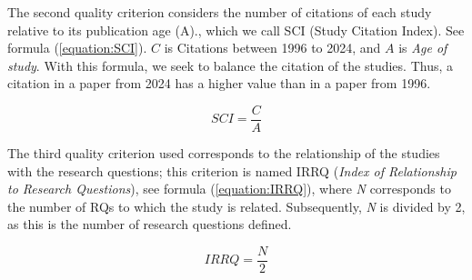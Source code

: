 The second quality criterion considers the number of citations of each study relative to its publication age (A)., which we call SCI (Study Citation Index). See  formula (\ref{equation:SCI}). $C$ is Citations between 1996 to 2024, and $A$ is \textit{Age of study}. With this formula, we seek to balance the citation of the studies. Thus, a citation in a  paper from 2024 has a higher value than in a paper from 1996.


\begin{equation}
	\label{equation:SCI}
	SCI = \frac{C}{A}
\end{equation}


\hbox{}
The third quality criterion used corresponds to the relationship of the studies with the research questions; this criterion is named IRRQ (\textit{Index of Relationship to Research Questions}), see formula (\ref{equation:IRRQ}), where \textit{N} corresponds to the number of RQs to which the study is related. Subsequently, \textit{N} is divided by 2, as this is the number of research questions defined.

\begin{equation}
	\label{equation:IRRQ}
	IRRQ = \frac{N}{2}
\end{equation}

